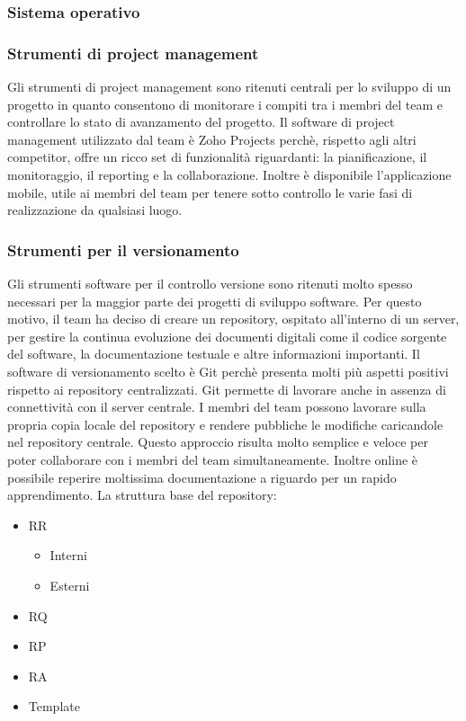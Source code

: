 \subsubsection{Sistema operativo}

\subsubsection{Strumenti di project management}
Gli strumenti di project management sono ritenuti centrali per lo sviluppo di un progetto in quanto consentono di monitorare i compiti tra i membri del team e controllare lo stato di avanzamento del progetto.
Il software di project management utilizzato dal team è Zoho Projects perchè, rispetto agli altri competitor, offre un ricco set di funzionalità riguardanti: la pianificazione, il monitoraggio, il reporting e la collaborazione.
Inoltre è disponibile l'applicazione mobile, utile ai membri del team per tenere sotto controllo le varie fasi di realizzazione da qualsiasi luogo.
  


\subsubsection{Strumenti per il versionamento}
Gli strumenti software per il controllo versione sono ritenuti molto spesso necessari per la maggior parte dei progetti di sviluppo software.
Per questo motivo, il team ha deciso di creare un repository, ospitato all'interno di un server, per gestire la continua evoluzione dei documenti digitali come il codice sorgente del software, la documentazione testuale e altre informazioni importanti.
Il software di versionamento scelto è Git perchè presenta molti più aspetti positivi rispetto ai repository centralizzati. Git permette di lavorare anche in assenza di connettività con il server centrale. I membri del team possono lavorare sulla propria copia locale del repository e rendere pubbliche le modifiche caricandole nel repository centrale. Questo approccio risulta molto semplice e veloce per poter collaborare con i membri del team simultaneamente.
Inoltre online è possibile reperire moltissima documentazione a riguardo per un rapido apprendimento. La struttura base del repository:
\begin{itemize}
  \item
	RR
	\begin{itemize}
		\item
			Interni
		\item
			Esterni
	\end{itemize}
  \item
    RQ
  \item
    RP
  \item
  	RA
  \item
  	Template 
\end{itemize}  
